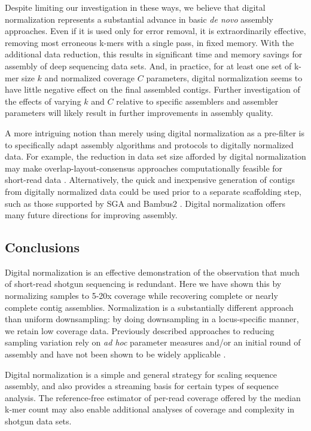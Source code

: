 \documentclass{pnastwo}
\begin{document}
\begin{article}
Despite limiting our investigation in these ways, we believe that
digital normalization represents a substantial advance in basic {\em
  de novo} assembly approaches.  Even if it is used only for error
removal, it is extraordinarily effective, removing most erroneous
k-mers with a single pass, in fixed memory.  With the additional data
reduction, this results in significant time and memory savings for
assembly of deep sequencing data sets.  And, in practice, for at least
one set of k-mer size $k$ and normalized coverage $C$ parameters, digital
normalization seems to have little negative effect on the final
assembled contigs.  Further investigation of the effects of varying
$k$ and $C$ relative to specific assemblers and assembler parameters
will likely result in further improvements in assembly quality.

A more intriguing notion than merely using digital normalization as a
pre-filter is to specifically adapt assembly algorithms and protocols
to digitally normalized data.  For example, the reduction in data set
size afforded by digital normalization may make
overlap-layout-consensus approaches computationally feasible for
short-read data \cite{pubmed20211242}.  Alternatively, the quick and
inexpensive generation of contigs from digitally normalized data could
be used prior to a separate scaffolding step, such as those supported
by SGA and Bambus2 \cite{pubmed20529929,pubmed21926123}.  Digital
normalization offers many future directions for improving assembly.

\subsection{Conclusions}

Digital normalization is an effective demonstration of the observation
that much of short-read shotgun sequencing is redundant.  Here we have
shown this by normalizing samples to 5-20x coverage while recovering
complete or nearly complete contig assemblies.  Normalization is a
substantially different approach than uniform downsampling: by doing
downsampling in a locus-specific manner, we retain low coverage data.
Previously described approaches to reducing sampling variation rely on
{\em ad hoc} parameter measures and/or an initial round of assembly
and have not been shown to be widely applicable
\cite{pubmed19724646,pubmed22028825}.

Digital normalization is a simple and general strategy for scaling
sequence assembly, and also provides a streaming basis for certain
types of sequence analysis.  The reference-free estimator of per-read
coverage offered by the median k-mer count may also enable additional
analyses of coverage and complexity in shotgun data sets.


\end{article}
\end{document}
